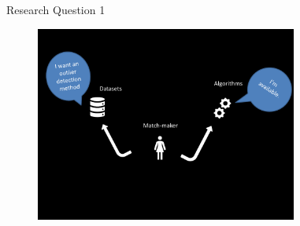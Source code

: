 \documentclass{beamer}
\begin{document}
\begin{darkframes}
\begin{frame}[noframenumbering,plain,label=figsnorm]
\begin{figure}[b]
{\begin{tikzpicture}
		\end{tikzpicture}}
	\end{figure}
	
	\end{frame}
 		
 \begin{frame}{Research Question 1}
 	\begin{figure}[!t]
 	\centering
 	\includegraphics[clip=true, height=6.45cm]{match_maker.pdf}%
   	\end{figure}
 	\end{frame}	
 	

\end{darkframes}
\end{document}

